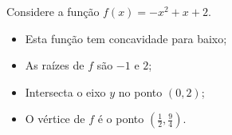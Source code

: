 \begin{exem}
 Considere a função $f(x)= -x^2+x+2$.

 \begin{itemize}
    \item Esta função tem concavidade para baixo;
    \item As raízes de $f$ são $-1$ e $2$;
    \item Intersecta o eixo $y$ no ponto $(0,2)$;
    \item O vértice de $f$ é o ponto $(\frac{1}{2}, \frac{9}{4})$.
\end{itemize}

\begin{center}
\end{center}

\end{exem}

